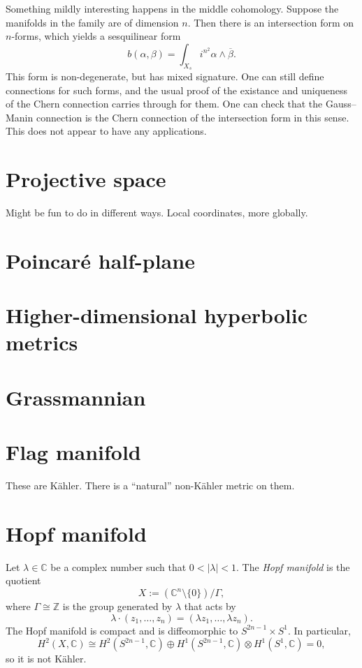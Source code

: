 \documentclass[11pt]{article}
\newcommand{\kk}[1]{\mathbb{#1}}
\begin{document}
Something mildly interesting happens in the middle cohomology. Suppose the manifolds in the family are of dimension $n$. Then there is an intersection form on $n$-forms, which yields a sesquilinear form
$$
b(\alpha, \beta) = \int_{X_s} i^{n^2} \alpha \wedge \overline{\beta}.
$$
This form is non-degenerate, but has mixed signature. One can still define connections for such forms, and the usual proof of the existance and uniqueness of the Chern connection carries through for them. One can check that the Gauss--Manin connection is the Chern connection of the intersection form in this sense. This does not appear to have any applications.


\section{Projective space}
\label{sec:orgcfabeed}

Might be fun to do in different ways. Local coordinates, more globally.

\section{Poincaré half-plane}
\label{sec:orgfbd87cb}

\section{Higher-dimensional hyperbolic metrics}
\label{sec:org21fa1aa}

\section{Grassmannian}
\label{sec:org34425b6}

\section{Flag manifold}
\label{sec:orga0ef6a0}

These are K\"ahler. There is a ``natural'' non-K\"ahler metric on them.

\section{Hopf manifold}
\label{sec:org8f5818e}

Let \(\lambda \in \kk C\) be a complex number such that \(0 < |\lambda| < 1\). The \emph{Hopf manifold} is the quotient
$$
X := (\kk C^n \setminus \{0\}) / \Gamma,
$$
where \(\Gamma \cong \kk Z\) is the group generated by \(\lambda\) that acts by
$$
\lambda \cdot (z_1, \ldots, z_n) = (\lambda z_1, \ldots, \lambda z_n).
$$
The Hopf manifold is compact and is diffeomorphic to \(S^{2n-1} \times S^1\). In particular,
$$
H^2(X, \kk C) \cong H^2(S^{2n-1}, \kk C) \oplus H^1(S^{2n-1}, \kk C) \otimes H^1(S^1, \kk C) = 0,
$$
so it is not K\"ahler.
\end{document}
